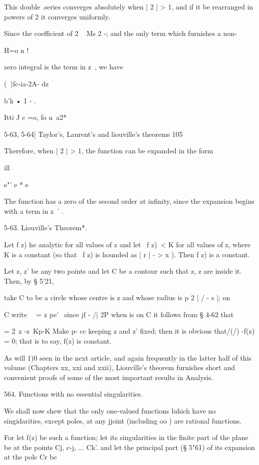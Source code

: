 {{{{This double .series converges absolutely when | 2 | > 1, and if it be
rearranged in powers of 2 it converges uniformly.

Since the coefficient of 2 ~ Ms 2 -; and the only term which
furnishes a non-

H=o n !

zero integral is the term in z~, we have

(\ )fc-ia-2A- dz

b'k • 1 - .

Itti J c =o, fo n\ a2*

5-63, 5-64] Taylor's, Laurent's and liouville's theorems 105

Therefore, when | 2 | > 1, the function can be expanded in the form

ill

e"' e * e

The function has a zero of the second order at infinity, since the
expansion begins with a term in z~' .

5-63. Liouville's Theorem*.

Let f z) he analytic for all values of z and let \ f z)\ < K for all
values of z, where K is a constant (so that \ f z) is hounded as | r |
- > x ). Then f z) is a constant.

Let z, z' be any two points and let C be a contour such that z, z are
inside it. Then, by § 5'21,

take C to be a circle whose centre is z and whose radius is p 2 | / -
s |; on

C write \ \ = z pe' \ since jf - /| 2P when is on C it follows from §
4-62 that

= 2\ z -z\ Kp-K Make p- cc keeping z and z' fixed; then it is obvious
that/(/) -f(z) = 0; that is to say, f(z) is constant.

As will 1)0 seen in the next article, and again frequently in the
latter half of this volume (Chapters xx, xxi and xxii), Liouville's
theorem furnishes short and convenient proofs of some of the most
important results in Analysis.

564. Functions with no essential singularities.

We shall now shew that the only one-valued functions luhich have no
singidarities, except poles, at any jjoint (including oo ) are
rational functions.

For let f(z) be such a function; let its singularities in the finite
part of the plane be at the points Cj, c-j, ... Ck'. and let the
principal part (§ 5"61) of its expansion at the pole Cr be

}}}}
